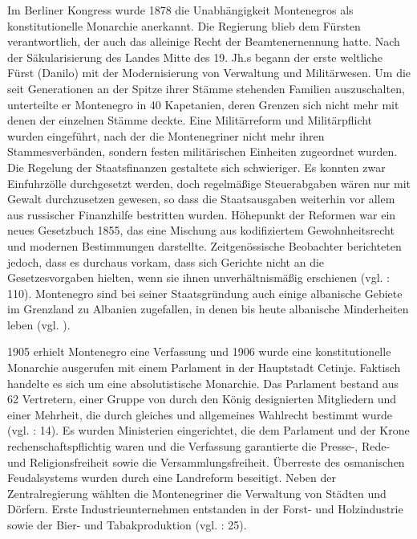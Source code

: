 Im Berliner Kongress wurde 1878 die Unabhängigkeit Montenegros als konstitutionelle Monarchie anerkannt. Die Regierung blieb dem Fürsten verantwortlich, der auch das alleinige Recht der Beamtenernennung hatte. Nach der Säkularisierung des Landes Mitte des 19. Jh.s begann der erste weltliche Fürst (Danilo) mit der Modernisierung von Verwaltung und Militärwesen. Um die seit Generationen an der Spitze ihrer Stämme stehenden Familien auszuschalten, unterteilte er Montenegro in 40 Kapetanien, deren Grenzen sich nicht mehr mit denen der einzelnen Stämme deckte. Eine Militärreform und Militärpflicht wurden eingeführt, nach der die Montenegriner nicht mehr ihren Stammesverbänden, sondern festen militärischen Einheiten zugeordnet wurden. Die Regelung der Staatsfinanzen gestaltete sich schwieriger. Es konnten zwar Einfuhrzölle durchgesetzt werden, doch regelmäßige Steuerabgaben wären nur mit Gewalt durchzusetzen gewesen, so dass die Staatsausgaben weiterhin vor allem aus russischer Finanzhilfe bestritten wurden. Höhepunkt der Reformen war ein neues Gesetzbuch 1855, das eine Mischung aus kodifiziertem Gewohnheitsrecht und modernen Bestimmungen darstellte. Zeitgenössische Beobachter berichteten jedoch, dass es durchaus vorkam, dass sich Gerichte nicht an die Gesetzesvorgaben hielten, wenn sie ihnen unverhältnismäßig erschienen (vgl. \cite{dickel}: 110). Montenegro sind bei seiner Staatsgründung auch einige albanische Gebiete im Grenzland zu Albanien zugefallen, in denen bis heute albanische Minderheiten leben (vgl. \cite{hoenehhol}).\par
1905 erhielt Montenegro eine Verfassung und 1906 wurde eine konstitutionelle Monarchie ausgerufen mit einem Parlament in der Hauptstadt Cetinje. Faktisch handelte es sich um eine absolutistische Monarchie. Das Parlament bestand aus 62 Vertretern, einer Gruppe von durch den König designierten Mitgliedern und einer Mehrheit, die durch gleiches und allgemeines Wahlrecht bestimmt wurde (vgl. \cite{brepohl}: 14). Es wurden Ministerien eingerichtet, die dem Parlament und der Krone rechenschaftspflichtig waren und die Verfassung garantierte die Presse-, Rede- und Religionsfreiheit sowie die Versammlungsfreiheit. Überreste des osmanischen Feudalsystems wurden durch eine Landreform beseitigt. Neben der Zentralregierung wählten die Montenegriner die Verwaltung von Städten und Dörfern. Erste Industrieunternehmen entstanden in der Forst- und Holzindustrie sowie der Bier- und Tabakproduktion (vgl. \cite{beardradin}: 25).\par
